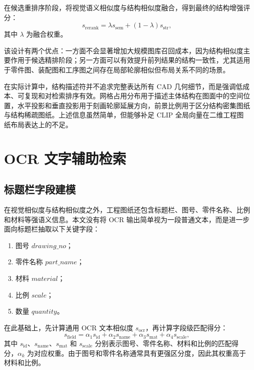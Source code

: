 在候选重排序阶段，将视觉语义相似度与结构相似度融合，得到最终的结构增强评分：
\begin{equation}
  s_{\text{rerank}}=\lambda s_{\text{sem}}+(1-\lambda)s_{\text{str}},
  \label{eq:rerank-score-new}
\end{equation}
其中 $\lambda$ 为融合权重。

该设计有两个优点：一方面不会显著增加大规模图库召回成本，因为结构相似度主要作用于候选精排阶段；另一方面可以有效提升前列结果的结构一致性，尤其适用于零件图、装配图和工序图之间存在局部轮廓相似但布局关系不同的场景。

在实际计算中，结构描述符并不追求完整表达所有 CAD 几何细节，而是强调低成本、可复现和对检索排序有效。网格占用分布用于描述主体结构在图面中的空间位置，水平投影和垂直投影用于刻画轮廓延展方向，前景比例用于区分结构密集图纸与结构稀疏图纸。上述信息虽然简单，但能够补足 CLIP 全局向量在二维工程图纸布局表达上的不足。

\section{OCR 文字辅助检索}

\subsection{标题栏字段建模}

在视觉相似度与结构相似度之外，工程图纸还包含标题栏、图号、零件名称、比例和材料等强语义信息。本文没有将 OCR 输出简单视为一段普通文本，而是进一步面向标题栏抽取以下关键字段：
\begin{enumerate}
  \item 图号 $drawing\_no$；
  \item 零件名称 $part\_name$；
  \item 材料 $material$；
  \item 比例 $scale$；
  \item 数量 $quantity$。
\end{enumerate}

在此基础上，先计算通用 OCR 文本相似度 $s_{\text{ocr}}$，再计算字段级匹配得分：
\begin{equation}
  s_{\text{field}}=\alpha_1 s_{\text{id}}+\alpha_2 s_{\text{name}}+\alpha_3 s_{\text{mat}}+\alpha_4 s_{\text{scale}},
  \label{eq:field-score-new}
\end{equation}
其中 $s_{\text{id}}$、$s_{\text{name}}$、$s_{\text{mat}}$ 和 $s_{\text{scale}}$ 分别表示图号、零件名称、材料和比例的匹配得分，$\alpha_k$ 为对应权重。由于图号和零件名称通常具有更强区分度，因此其权重高于材料和比例。

